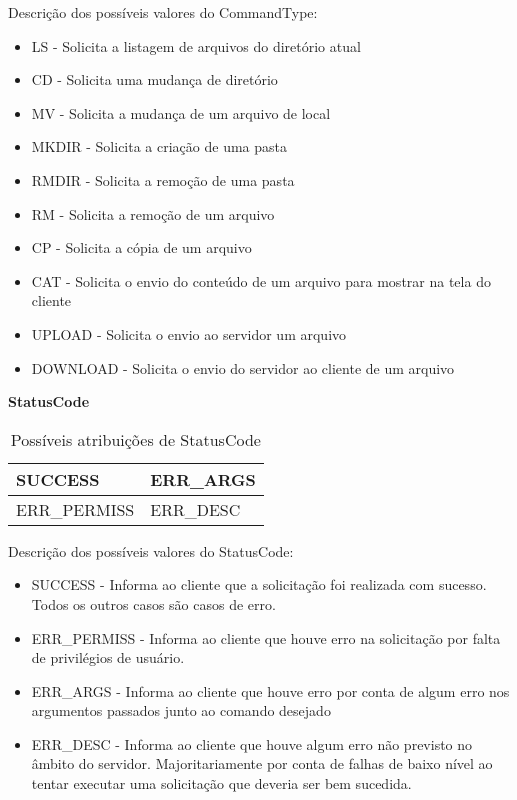 \documentclass[
	11pt,				%
	oneside,			%
	a4paper,			%
	english,			%
	brazil,				%
	]{article}
\begin{document}
Descrição dos possíveis valores do CommandType:
\begin{itemize}
 \item LS - Solicita a listagem de arquivos do diretório atual
 \item CD - Solicita uma mudança de diretório
 \item MV - Solicita a mudança de um arquivo de local
 \item MKDIR - Solicita a criação de uma pasta
 \item RMDIR - Solicita a remoção de uma pasta
 \item RM - Solicita a remoção de um arquivo
 \item CP - Solicita a cópia de um arquivo
 \item CAT - Solicita o envio do conteúdo de um arquivo para mostrar na tela do cliente
 \item UPLOAD - Solicita o envio ao servidor um arquivo
 \item DOWNLOAD - Solicita o envio do servidor ao cliente de um arquivo
\end{itemize}

\begin{center}
\textbf{StatusCode}
\end{center}

\begin{table}[H]
\centering
\begin{tabular}{|l|l|}
\hline
SUCCESS & ERR\_ARGS \\
\hline
ERR\_PERMISS & ERR\_DESC \\
\hline
\end{tabular}
\caption{Possíveis atribuições de StatusCode}
\label{tab:matrizes}
\end{table}

Descrição dos possíveis valores do StatusCode:
\begin{itemize}
 \item SUCCESS - Informa ao cliente que a solicitação foi realizada com sucesso. Todos os outros casos são casos de erro.
 \item ERR\_PERMISS - Informa ao cliente que houve erro na solicitação por falta de privilégios de usuário.
 \item ERR\_ARGS - Informa ao cliente que houve erro por conta de algum erro nos argumentos passados junto ao comando desejado
 \item ERR\_DESC - Informa ao cliente que houve algum erro não previsto no âmbito do servidor. Majoritariamente por conta de falhas de baixo nível ao tentar executar uma solicitação que deveria ser bem sucedida.
\end{itemize}
\end{document}
